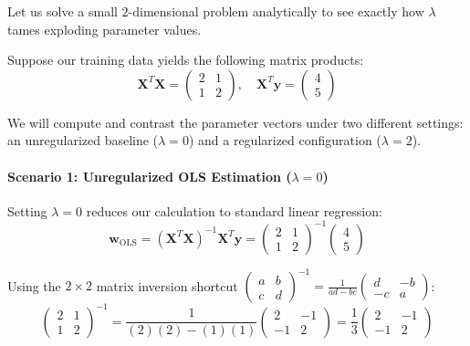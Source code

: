 \documentclass{article}
\begin{document}
Let us solve a small $2$-dimensional problem analytically to see exactly how $\lambda$ tames exploding parameter values.

Suppose our training data yields the following matrix products:
\begin{equation}
\mathbf{X}^T\mathbf{X} = \begin{pmatrix} 2 & 1 \\ 1 & 2 \end{pmatrix}, \quad \mathbf{X}^T\mathbf{y} = \begin{pmatrix} 4 \\ 5 \end{pmatrix}
\end{equation}

We will compute and contrast the parameter vectors under two different settings: an unregularized baseline ($\lambda = 0$) and a regularized configuration ($\lambda = 2$).

\paragraph{Scenario 1: Unregularized OLS Estimation ($\lambda = 0$)}
Setting $\lambda = 0$ reduces our calculation to standard linear regression:
\begin{equation}
\mathbf{w}_{\text{OLS}} = (\mathbf{X}^T\mathbf{X})^{-1}\mathbf{X}^T\mathbf{y} = \begin{pmatrix} 2 & 1 \\ 1 & 2 \end{pmatrix}^{-1} \begin{pmatrix} 4 \\ 5 \end{pmatrix}
\end{equation}

Using the $2 \times 2$ matrix inversion shortcut $\begin{pmatrix} a & b \\ c & d \end{pmatrix}^{-1} = \frac{1}{ad-bc}\begin{pmatrix} d & -b \\ -c & a \end{pmatrix}$:
\begin{equation}
\begin{pmatrix} 2 & 1 \\ 1 & 2 \end{pmatrix}^{-1} = \frac{1}{(2)(2) - (1)(1)}\begin{pmatrix} 2 & -1 \\ -1 & 2 \end{pmatrix} = \frac{1}{3}\begin{pmatrix} 2 & -1 \\ -1 & 2 \end{pmatrix}
\end{equation}
\end{document}
